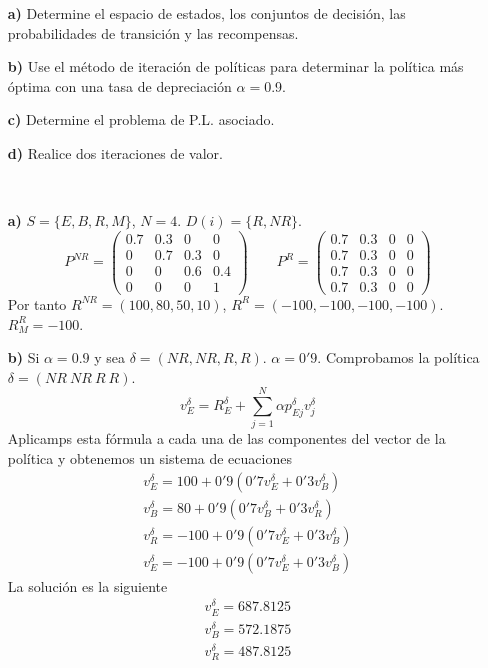 \documentclass[twoside]{article}
\begin{document}
\begin{ejercicio}{1}
\begin{itemize}
\item[\textbf{a)}] Determine el espacio de estados, los conjuntos de decisión, las probabilidades de transición y las recompensas.
\item[\textbf{b)}] Use el método de iteración de políticas para determinar la política más óptima con una tasa de depreciación $\alpha=$0.9.
\item[\textbf{c)}] Determine el problema de P.L. asociado.
\item[\textbf{d)}] Realice dos iteraciones de valor.
\end{itemize}
\begin{solucion}\
\begin{itemize}
\item[\textbf{a)}] $S=\{E,B,R,M\}$, $N=4$. $D(i)=\{R,NR\}$. 
$$
P^{NR} = 
\begin{pmatrix}
0.7 & 0.3 & 0 & 0\\
0   & 0.7 & 0.3& 0\\
0 & 0 & 0.6 & 0.4\\
0 & 0 & 0 & 1
\end{pmatrix} \qquad
P^R = 
\begin{pmatrix}
0.7 & 0.3 & 0 & 0\\
0.7 & 0.3 & 0 & 0\\
0.7 & 0.3 & 0 & 0\\
0.7 & 0.3 & 0 & 0
\end{pmatrix}
$$
Por tanto $R^{NR} = (100, 80, 50, 10)$, $R^R = (-100, -100, -100, -100)$. $R^R_M = -100$.
\item[\textbf{b)}] Si $\alpha = 0.9$ y sea $\delta = (NR,NR,R,R)$.
$\alpha=0'9$. Comprobamos la política $\delta=(NR\ NR\ R\ R)$. 
$$v^\delta_E=R^\delta_E+\sum_{j=1}^N\alpha p^\delta_{Ej}v^\delta_j$$
Aplicamps esta fórmula a cada una de las componentes del vector de la política y obtenemos un sistema de ecuaciones
\begin{align*}
v^\delta_E=100+0'9(0'7v^\delta_E+0'3v^\delta_B)\\
v^\delta_B=80+0'9(0'7v^\delta_B+0'3v^\delta_R)\\
v^\delta_R=-100+0'9(0'7v^\delta_E+0'3v^\delta_B)\\
v^\delta_E=-100+0'9(0'7v^\delta_E+0'3v^\delta_B)
\end{align*}
La solución es la siguiente
\begin{align*}
v^\delta_E=687.8125\\
v^\delta_B=572.1875\\
v^\delta_R=487.8125\\

\end{align*}
\end{itemize}
\end{solucion}
\end{ejercicio}
\end{document}
